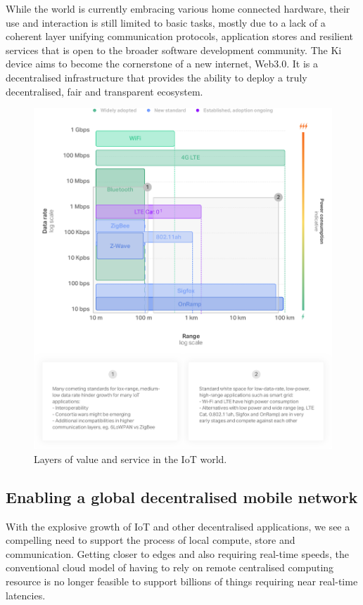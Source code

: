While the world is currently embracing various home connected hardware, their use and interaction is still limited to basic tasks, mostly due to a lack of a coherent layer unifying communication protocols, application stores and resilient services that is open to the broader software development community. The Ki device aims to become the cornerstone of a new internet, Web3.0. It is a decentralised infrastructure that provides the ability to deploy a truly decentralised, fair and transparent ecosystem.
\begin{figure}
	\includegraphics[width=\linewidth, trim= 0cm 0cm 0cm 0cm, clip]{Figures/wireless.png}
	\caption{Layers of value and service in the IoT world.}
	\label{fig:wireless}
\end{figure}
\subsection{Enabling a global decentralised mobile network}
With the explosive growth of IoT and other decentralised applications, we see a compelling need to support the process of local compute, store and communication. Getting closer to edges and also requiring real-time speeds, the conventional cloud model of having to rely on remote centralised computing resource is no longer feasible to support billions of things requiring near real-time latencies.


